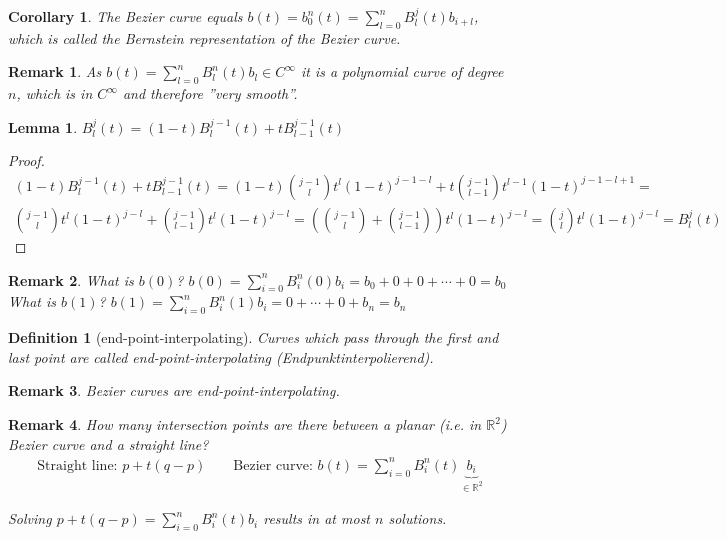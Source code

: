 \documentclass[]{article}
\newtheorem{lemma}{Lemma}
\newtheorem{definition}{Definition}
\newtheorem{remark}{Remark}
\newtheorem{corollary}{Corollary}
\begin{document}
\begin{corollary}
	The Bezier curve equals $b(t) = b_0^n(t) = \sum_{l=0}^{n} B_l^j(t) b_{i+l}$, which is called the Bernstein representation of the Bezier curve.
\end{corollary}

\begin{remark}
	As $b(t) = \sum_{l=0}^{n} B_l^n(t) b_l \in C^\infty$ it is a polynomial curve of degree $n$, which is in $C^\infty$ and therefore ''very smooth''.
\end{remark}

\begin{lemma}
	$B_l^j(t) = (1-t)B_l^{j-1}(t) + t B_{l-1}^{j-1}(t)$
\end{lemma}

\begin{proof}
	\begin{align*}
		(1-t)B_l^{j-1}(t) + t B_{l-1}^{j-1}(t) = (1-t) \binom{j-1}{l} t^l (1-t)^{j-1-l} + t \binom{j-1}{l-1} t^{l-1} (1-t)^{j-1-l+1} =\\
		\binom{j-1}{l} t^l (1-t)^{j-l} + \binom{j-1}{l-1} t^{l} (1-t)^{j-l} = \left(\binom{j-1}{l} + \binom{j-1}{l-1}\right) t^l (1-t)^{j-l} = \binom{j}{l} t^l (1-t)^{j-l} = B_l^j(t)
	\end{align*}
\end{proof}

\begin{remark}
	What is $b(0)$? \hspace{1cm} $b(0)=\sum_{i=0}^{n} B_i^n(0) b_i = b_0 + 0 + 0 + \cdots + 0 = b_0$\\
	What is $b(1)$? \hspace{1cm} $b(1)=\sum_{i=0}^{n} B_i^n(1) b_i = 0 + \cdots + 0 + b_n = b_n$
\end{remark}

\begin{definition}[end-point-interpolating]
	Curves which pass through the first and last point are called end-point-interpolating (Endpunktinterpolierend).
\end{definition}

\begin{remark}
	Bezier curves are end-point-interpolating.
\end{remark}

\begin{remark}
	How many intersection points are there between a planar (i.e. in $\mathbb{R}^2$) Bezier curve and a straight line?
	\begin{align*}
		\text{Straight line: } p + t(q-p) && \text{ Bezier curve: } b(t) = \sum_{i=0}^{n} B_i^n(t) \underbrace{b_i}_{\in \mathbb{R}^2}
	\end{align*}
	
	Solving $p+t(q-p) = \sum_{i=0}^{n} B_i^n(t) b_i$ results in at most $n$ solutions.
\end{remark}
\end{document}
